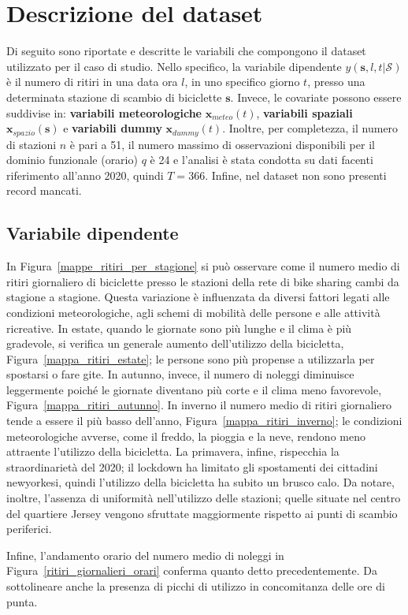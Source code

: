 \section[Descrizione del dataset]{Descrizione del dataset}
Di seguito sono riportate e descritte le variabili che compongono il dataset utilizzato per il caso di studio. Nello specifico, la variabile dipendente $y(\mathbf{s}, l, t|\mathcal{S})$ è il numero di ritiri in una data ora $l$, in uno specifico giorno $t$, presso una determinata stazione di scambio di biciclette $\mathbf{s}$. Invece, le covariate possono essere suddivise in: \textbf{variabili meteorologiche} $\mathbf{x}_{meteo}(t)$, \textbf{variabili spaziali} $\mathbf{x}_{spazio}(\mathbf{s})$ e \textbf{variabili dummy} $\mathbf{x}_{dummy}(t)$. Inoltre, per completezza, il numero di stazioni $n$ è pari a \num{51}, il numero massimo di osservazioni disponibili per il dominio funzionale (orario) $q$ è \num{24} e l'analisi è stata condotta su dati facenti riferimento all'anno \num{2020}, quindi $T=366$. Infine, nel dataset non sono presenti record mancati.

\subsection[Numero di ritiri]{Variabile dipendente}
In Figura~\ref{mappe_ritiri_per_stagione} si può osservare come il numero medio di ritiri giornaliero di biciclette presso le stazioni della rete di bike sharing cambi da stagione a stagione. Questa variazione è influenzata da diversi fattori legati alle condizioni meteorologiche, agli schemi di mobilità delle persone e alle attività ricreative. In estate, quando le giornate sono più lunghe e il clima è più gradevole, si verifica un generale aumento dell'utilizzo della bicicletta, Figura~\ref{mappa_ritiri_estate}; le persone sono più propense a utilizzarla per spostarsi o fare gite. In autunno, invece, il numero di noleggi diminuisce leggermente poiché le giornate diventano più corte e il clima meno favorevole, Figura~\ref{mappa_ritiri_autunno}. In inverno il numero medio di ritiri giornaliero tende a essere il più basso dell'anno, Figura~\ref{mappa_ritiri_inverno}; le condizioni meteorologiche avverse, come il freddo, la pioggia e la neve, rendono meno attraente l'utilizzo della bicicletta. La primavera, infine, rispecchia la straordinarietà del \num{2020}; il lockdown ha limitato gli spostamenti dei cittadini newyorkesi, quindi l'utilizzo della bicicletta ha subito un brusco calo. Da notare, inoltre, l'assenza di uniformità nell'utilizzo delle stazioni; quelle situate nel centro del quartiere Jersey vengono sfruttate maggiormente rispetto ai punti di scambio periferici.
\par Infine, l'andamento orario del numero medio di noleggi in Figura~\ref{ritiri_giornalieri_orari} conferma quanto detto precedentemente. Da sottolineare anche la presenza di picchi di utilizzo in concomitanza delle ore di punta.


